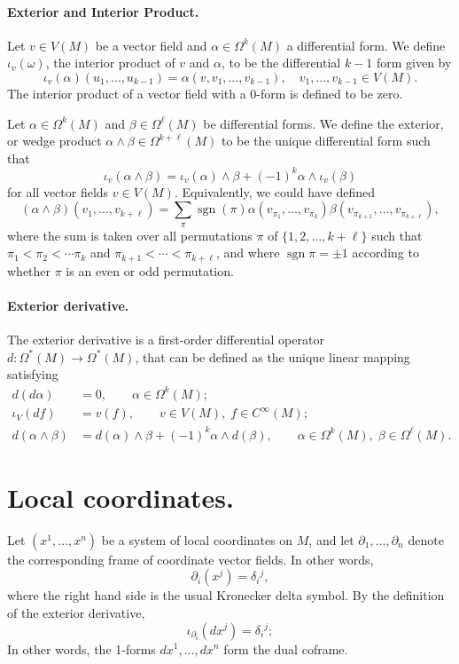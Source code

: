 \documentclass[12pt]{article}
\begin{document}
  
\paragraph{Exterior and Interior Product.}
Let $v\in V(M)$ be a vector field and $\alpha\in \Omega^k(M)$ a
differential form.  We define $\iota_v(\omega)$, the interior product
of $v$ and $\alpha$, to be the differential $k-1$ form given by
\[ \iota_v(\alpha)(u_1,\dots,u_{k-1}) =
\alpha(v,v_1,\dots,v_{k-1}),\quad v_1,\dots,v_{k-1}\in V(M).\] The
interior product of a vector field with a $0$-form is defined to be
zero.  

Let $\alpha\in \Omega^k(M)$ and $\beta\in\Omega^\ell(M)$ be differential
forms.  We define the exterior, or wedge product
$\alpha\wedge\beta\in\Omega^{k+\ell}(M)$ to be the 
unique differential form such that
\[ \iota_v(\alpha\wedge\beta) = \iota_v(\alpha)\wedge \beta + (-1)^k
\alpha \wedge \iota_v(\beta)\]
for all vector fields $v\in V(M)$.  Equivalently, we could have defined
\[ (\alpha\wedge\beta)(v_1,\dots, v_{k+\ell}) =
\sum_{\pi}\operatorname{sgn}(\pi)
\alpha(v_{\pi_1},\dots,v_{\pi_k})
\beta(v_{\pi_{k+1}},\dots,v_{\pi_{k+\ell}}),\] where the sum is taken
over all permutations $\pi$ of $\{1,2,\dots, k+\ell\}$ such that $\pi_1<
\pi_2 < \cdots \pi_k$ and $\pi_{k+1} < \cdots < \pi_{k+\ell}$, and where
$\operatorname{sgn} \pi=\pm 1$ according to whether $\pi$ is an even
or odd permutation.



\paragraph{Exterior derivative.} The exterior derivative is a
first-order differential operator $d:\Omega^*(M)\rightarrow
\Omega^*(M)$, that can be defined as the unique linear mapping 
satisfying
\begin{align*}
  d(d \alpha)&=0, \qquad \alpha\in\Omega^k(M);\\
  \iota_V(df)&=v(f),\qquad  v\in V(M),\;f\in C^\infty(M);\\
  d(\alpha \wedge \beta) &= d(\alpha)\wedge \beta + (-1)^k
  \alpha\wedge d(\beta), \qquad
  \alpha\in\Omega^k(M),\;\beta\in \Omega^\ell(M).
\end{align*}


\section{Local coordinates.}
Let $(x^1,\ldots,x^n)$ be a system of local coordinates on $M$, and
let $\partial_1,\dots,\partial_n$ denote the corresponding frame of
coordinate vector fields. In other words, 
\[ \partial_i(x^j) = \delta_i{}^j,\] where the right hand side is the
usual Kronecker delta symbol. By the definition of the
exterior derivative, 
\[\iota_{\partial_i} (dx^j) = \delta_i{}^j;\]
In other words, the 1-forms $dx^1,\dots,dx^n$ form the dual coframe.
\end{document}
